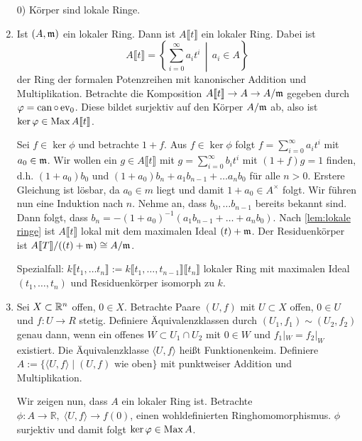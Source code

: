 \documentclass[12pt,a4paper]{scrartcl}
\theoremstyle{cplain}
\theoremstyle{cdef}
\begin{document}
\begin{bsp}
	\begin{enumerate}
        \leavevmode
		\item[0)] Körper sind lokale Ringe.
        \item Ist $(A,\mathfrak{m})$ ein lokaler Ring. Dann ist $A\llbracket t \rrbracket$ ein lokaler Ring. Dabei ist \[ A\llbracket t \rrbracket=\left\{\sum_{i=0}^\infty a_it^i \,\middle|\, a_i \in A\right\} \] der Ring der formalen Potenzreihen mit kanonischer Addition und Multiplikation. Betrachte die Komposition $A\llbracket t \rrbracket \to A \to A/\mathfrak{m}$ gegeben durch $\varphi=\operatorname{can} \circ \operatorname{ev}_0$. Diese bildet surjektiv auf den Körper $A/\mathfrak{m}$ ab, also ist $\operatorname{ker} \varphi \in \operatorname{Max} A\llbracket t \rrbracket$.
        
        Sei $f \in \ker \phi$ und betrachte $1+ f$. Aus $f \in \ker \phi$ folgt $f=\sum_{i=0}^\infty a_it^i$ mit $a_0 \in \mathfrak{m}$. Wir wollen ein $g \in A\llbracket t\rrbracket$ mit $g=\sum_{i=0}^\infty b_it^i$ mit $(1+f)g=1$ finden, d.h. $(1+a_0)b_0$ und $(1+a_0)b_n+a_1b_{n-1}+\dots a_nb_0$ für alle $n > 0$. Erstere Gleichung ist lösbar, da $a_0 \in m$ liegt und damit $1+a_0 \in A^{\times}$ folgt. Wir führen nun eine Induktion nach $n$. Nehme an, dass $b_0, \dots b_{n-1}$ bereits bekannt sind. Dann folgt, dass $b_n=-(1+a_0)^{-1}(a_1b_{n-1}+\dots+a_nb_0)$. Nach \cref{lem:lokale ringe} ist $A\llbracket t \rrbracket$ lokal mit dem maximalen Ideal $(t)+\mathfrak{m}$. Der Residuenkörper ist $A\llbracket T\rrbracket /((t)+\mathfrak{m}) \cong A/\mathfrak{m}$.

        Spezialfall: $k\llbracket t_1,\dots t_n\rrbracket := k\llbracket t_1,\dots,t_{n-1}\rrbracket\llbracket t_n\rrbracket$ lokaler Ring mit maximalen Ideal $(t_1,\dots,t_n)$ und Residuenkörper isomorph zu $k$.
        
		\item Sei $X \subset \mathbb R^n$ offen, $0 \in X$. Betrachte Paare $(U,f)$ mit $U \subset X$ offen, $0 \in U$ und $f:U \to R$ stetig. Definiere Äquivalenzklassen durch $(U_1,f_1) \sim (U_2,f_2)$ genau dann, wenn ein offenes $W \subset U_1 \cap U_2$ mit $0 \in W$ und $f_1|_W=f_2|_W$ existiert. Die Äquivalenzklasse $\langle U,f \rangle$ heißt Funktionenkeim. Definiere $A := \{\langle U,f \rangle \mid (U,f) \text{ wie oben}\}$ mit  punktweiser Addition und Multiplikation.

		Wir zeigen nun, dass $A$ ein lokaler Ring ist. Betrachte $\phi: A \to \mathbb{R}, \; \langle U,f \rangle \to f(0)$, einen wohldefinierten Ringhomomorphismus. $\phi$ surjektiv und damit folgt $\operatorname{ker} \varphi \in \operatorname{Max} A$.


\end{enumerate}
\end{bsp}
\end{document}
